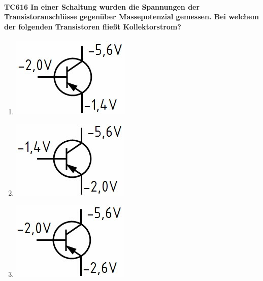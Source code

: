 \documentclass[8pt]{article}
\begin{document}
\begin{enumerate}
\begin{enumerate}[nolistsep,label=\Alph*]
{\begin{enumerate}[nolistsep,label=\Alph*]
\paragraph*{TC616 In einer Schaltung wurden die Spannungen der Transistoranschlüsse gegenüber Massepotenzial gemessen. Bei welchem der folgenden Transistoren fließt Kollektorstrom?}
\begin{enumerate}[nolistsep,label=\Alph*]
\item
	\begin{center}
		\begin{minipage}{\linewidth}
			\centering
			\includegraphics[scale=1.0]{pics/tc616_a.jpg}
		\end{minipage}
	\end{center}
\item
	\begin{center}
		\begin{minipage}{\linewidth}
			\centering
			\includegraphics[scale=1.0]{pics/tc616_b.jpg}
		\end{minipage}
	\end{center}
\item
	\begin{center}
		\begin{minipage}{\linewidth}
			\centering
			\includegraphics[scale=1.0]{pics/tc616_c.jpg}
		\end{minipage}

\end{center}
\end{enumerate}
\end{enumerate}}
\end{enumerate}
\end{enumerate}
\end{document}
